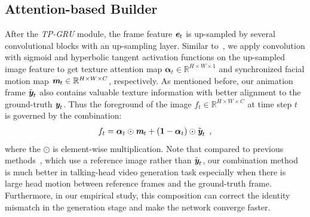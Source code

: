 \documentclass[runningheads]{llncs}
\def\mathbi#1{\textbf{\em #1}}
\begin{document}
\subsection{Attention-based Builder} 
\label{subsec:AttBuilder}
After the \textit{TP-GRU} module, the frame feature $\mathbi{e}_t$ is up-sampled by several convolutional blocks with an up-sampling layer. Similar to~\cite{pumarola2019ganimation}, we apply convolution with sigmoid and hyperbolic tangent activation functions on the up-sampled image feature to get texture attention map $\boldsymbol{\alpha}_t \in \mathbb{R}^{H\times W \times1}$ and synchronized facial motion map $\mathbi{m}_t \in \mathbb{R}^{H\times W \times C}$, respectively. As mentioned before, our animation frame $\tilde{\mathbi{y}}_t$ also contains valuable texture information with better alignment to the ground-truth $ \mathbi{y}_t  $. Thus the foreground of the image $f_t \in \mathbb{R}^{H\times W \times C}$ at time step $t$ is governed by the combination:
\begin{equation}
\begin{aligned}
 f_t =   \boldsymbol{\alpha}_t \odot \mathbi{m}_t + (\mathbf{1}- \boldsymbol{\alpha}_t ) \odot \tilde{\mathbi{y}}_t  \enspace,
\end{aligned}
\label{eq:foreground}    
\end{equation}
where the $\odot$ is element-wise multiplication. Note that compared to previous methods~\cite{pumarola2019ganimation,chen2019hierarchical,wang2018high}, which use a reference image rather than $\tilde{\mathbi{y}}_t$, our combination method is much better in talking-head video generation task especially when there is large head motion between reference frames and the ground-truth frame. Furthermore, in our empirical study, this composition can correct the identity mismatch in the generation stage and make the network converge faster. 
\end{document}
